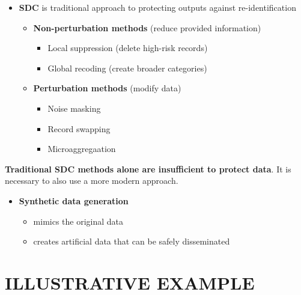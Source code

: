 \documentclass[a0,portrait]{a0poster}
\begin{document}
\begin{multicols}{3}
\begin{itemize}
    \item[\ding{228}]  \textbf{SDC} is traditional approach to protecting outputs against re-identification
        \begin{itemize}
            \item \textbf{Non-perturbation methods} (reduce provided information)
                \begin{itemize}
                    \item Local suppression (delete high-risk records)
                    \item Global recoding (create broader categories)
                \end{itemize}   
            \item \textbf{Perturbation methods} (modify data)
                \begin{itemize}
                    \item Noise masking
                    \item Record swapping
                    \item Microaggregaation
                \end{itemize}             
        \end{itemize}   
\end{itemize}

\textbf{Traditional SDC methods alone are insufficient to protect data}. It is necessary to also use a more modern approach.

\begin{itemize}
     \item[\ding{228}] \textbf{Synthetic data generation}
        \begin{itemize}
            \item mimics the original data
            \item creates artificial data that can be safely disseminated
        \end{itemize}        
\end{itemize}

\section{ILLUSTRATIVE EXAMPLE}






\end{multicols}
\end{document}
